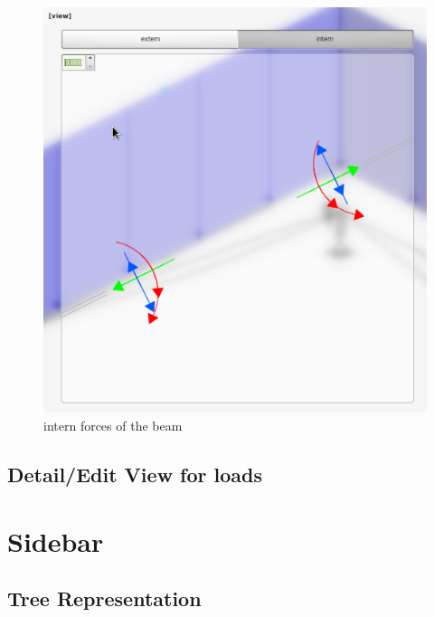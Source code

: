 \documentclass[a4paper,11pt]{report}
\begin{document}
\begin{minipage}[h]{0.5\textwidth-0.5cm}
\begin{figure}[H]
\begin{center}
\includegraphics[width=\textwidth]{../pictures/internforcesdetail.png}
\caption{intern forces of the beam}
\label{pic:internforces}
\end{center}
\end{figure}
\end{minipage}













\subsection{Detail/Edit View for loads}
\label{sec:loaddetail}

\section{Sidebar}
\label{sec:sidebar}

\subsection{Tree Representation}
\label{ssec:tree}
\end{document}
